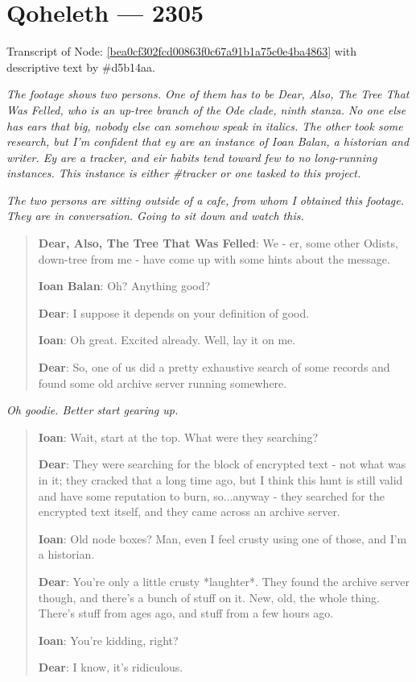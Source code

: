 \hypertarget{qoheleth-2305}{%
\chapter*{Qoheleth --- 2305}\label{qoheleth-2305}}

Transcript of Node: \href{http://35.165.134.227/node/bea0cf302fcd00863f0c67a91b1a75c0e4ba4863}{{[}bea0cf302fcd00863f0c67a91b1a75c0e4ba4863{]}} with descriptive text by \#d5b14aa.

\secdiv{}

\emph{The footage shows two persons. One of them has to be Dear, Also, The Tree That Was Felled, who is an up-tree branch of the Ode clade, ninth stanza. No one else has ears that big, nobody else can somehow speak in italics. The other took some research, but I'm confident that ey are an instance of Ioan Balan, a historian and writer. Ey are a tracker, and eir habits tend toward few to no long-running instances. This instance is either \#tracker or one tasked to this project.}

\emph{The two persons are sitting outside of a cafe, from whom I obtained this footage. They are in conversation. Going to sit down and watch this.}

\begin{quote}
\textbf{Dear, Also, The Tree That Was Felled}: We - er, some other Odists, down-tree from me - have come up with some hints about the message.

\textbf{Ioan Balan}: Oh? Anything good?

\textbf{Dear}: I suppose it depends on your definition of good.

\textbf{Ioan}: Oh great. Excited already. Well, lay it on me.

\textbf{Dear}: So, one of us did a pretty exhaustive search of some records and found some old archive server running somewhere.
\end{quote}

\emph{Oh goodie. Better start gearing up.}

\begin{quote}
\textbf{Ioan}: Wait, start at the top. What were they searching?

\textbf{Dear}: They were searching for the block of encrypted text - not what was in it; they cracked that a long time ago, but I think this hunt is still valid and have some reputation to burn, so...anyway - they searched for the encrypted text itself, and they came across an archive server.

\textbf{Ioan}: Old node boxes? Man, even I feel crusty using one of those, and I'm a historian.

\textbf{Dear}: You're only a little crusty *laughter*. They found the archive server though, and there's a bunch of stuff on it. New, old, the whole thing. There's stuff from ages ago, and stuff from a few hours ago.

\textbf{Ioan}: You're kidding, right?

\textbf{Dear}: I know, it's ridiculous.
\end{quote}

